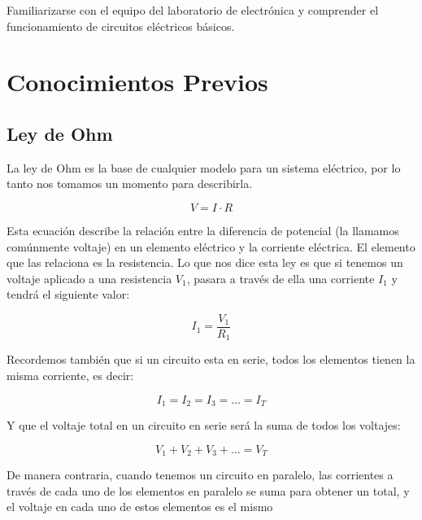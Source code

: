 	Familiarizarse con el equipo del laboratorio de electrónica y comprender el funcionamiento de circuitos eléctricos básicos.


\section{Conocimientos Previos}


	\subsection{Ley de Ohm}

		La ley de Ohm es la base de cualquier modelo para un sistema eléctrico, por lo tanto nos tomamos un momento para describirla.

		\begin{equation}
			V = I \cdot R
		\end{equation}

		Esta ecuación describe la relación entre la diferencia de potencial (la llamamos comúnmente voltaje) en un elemento eléctrico y la corriente eléctrica. El elemento que las relaciona es la resistencia. Lo que nos dice esta ley es que si tenemos un voltaje aplicado a una resistencia $V_1$, pasara a través de ella una corriente $I_1$ y tendrá el siguiente valor:

		\begin{equation}
			I_1 = \frac{V_1}{R_1}
		\end{equation}

		Recordemos también que si un circuito esta en serie, todos los elementos tienen la misma corriente, es decir:

		\begin{equation}
			I_1 = I_2 = I_3 = ... = I_T
		\end{equation}

		Y que el voltaje total en un circuito en serie será la suma de todos los voltajes:

		\begin{equation}
			V_1 + V_2 + V_3 + ... = V_T
		\end{equation}

		De manera contraria, cuando tenemos un circuito en paralelo, las corrientes a través de cada uno de los elementos en paralelo se suma para obtener un total, y el voltaje en cada uno de estos elementos es el mismo

